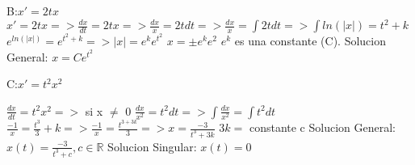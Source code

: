 \documentclass[12pt]{article}
\begin{document}
B:$x'=2tx$
$x'= 2tx => \frac{dx}{dt}= 2tx => \frac{dx}{x}= 2tdt => \frac{dx}{x} = \int 2tdt => \int ln(|x|) = t^{2}+k$
$e^{ln(|x|)} = e^{t^{2}+k} => |x|= e^{k}e^{t^{2}}$
$x=  \pm e^{k}e^{2}$ $e^{k}$ es una constante (C).
Solucion General: $x= Ce^{t^{2}}$


C:$x'=t^{2}x^{2}$

$\frac{dx}{dt}=t^{2}x^{2} => $ si x $\neq$ 0 $\frac{dx}{x^{2}}= t^{2}dt => \int \frac{dx}{x^{2}} = \int t^{2}dt$
$\frac{-1}{x} = \frac{t^{3}}{3} +k => \frac{-1}{x} = \frac{t^{3+3k}}{3} => x = \frac{-3}{t^{3}+3k}$
$3k = $ constante c 
Solucion General: $x(t) = \frac{-3}{t^{3}+c}, c \in \mathbb{R}$
Solucion Singular: $x(t) = 0$
\end{document}
